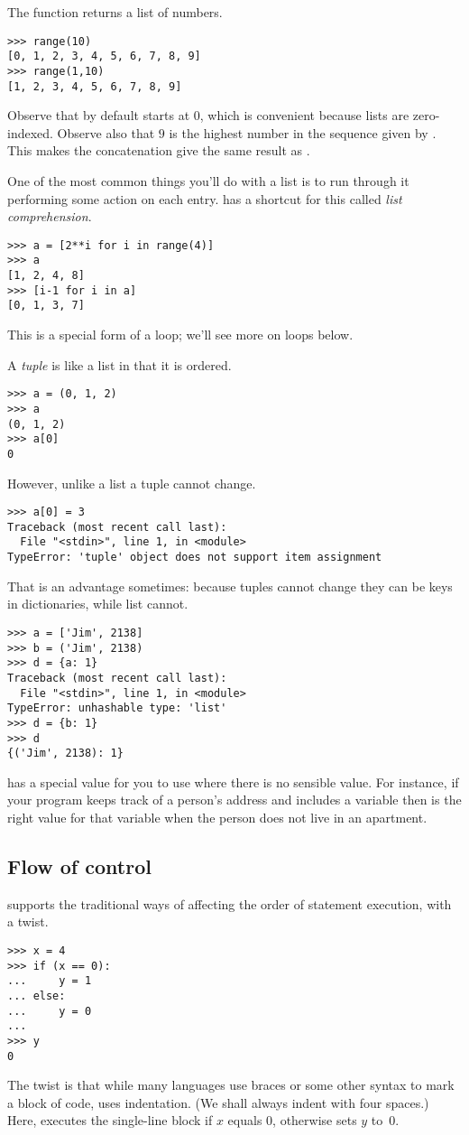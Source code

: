 The function  returns a list of numbers.
\begin{lstlisting}[style=python]
 >>> range(10)
[0, 1, 2, 3, 4, 5, 6, 7, 8, 9]
>>> range(1,10)
[1, 2, 3, 4, 5, 6, 7, 8, 9] 
\end{lstlisting}
Observe that by default  starts at $0$, which
is convenient because lists are zero-indexed.
Observe also that $9$ is the highest number in the sequence 
given by .
This makes the concatenation  give 
the same result as .

One of the most common things you'll do with a list is to run through
it performing some action on each entry.
\python{} has a shortcut for this called \textit{list comprehension}.
\begin{lstlisting}
>>> a = [2**i for i in range(4)]
>>> a
[1, 2, 4, 8]
>>> [i-1 for i in a]
[0, 1, 3, 7]
\end{lstlisting}
This is a special form of a loop; we'll see more on loops below.

A \textit{tuple} is like a list in that it is ordered.
\begin{lstlisting}[style=python]
>>> a = (0, 1, 2)
>>> a
(0, 1, 2)
>>> a[0]
0
\end{lstlisting}
However, unlike a list a tuple cannot change.
\begin{lstlisting}[style=python]
>>> a[0] = 3
Traceback (most recent call last):
  File "<stdin>", line 1, in <module>
TypeError: 'tuple' object does not support item assignment
\end{lstlisting}
That is an advantage sometimes:
because tuples cannot change they can be keys in dictionaries, while
list cannot.
\begin{lstlisting}[style=python]
>>> a = ['Jim', 2138]
>>> b = ('Jim', 2138)
>>> d = {a: 1}
Traceback (most recent call last):
  File "<stdin>", line 1, in <module>
TypeError: unhashable type: 'list'
>>> d = {b: 1}
>>> d
{('Jim', 2138): 1}
\end{lstlisting}

\python{} has a special value  for you to use
where there is no sensible value.
For instance, if your program keeps track of a person's address and
includes a variable  then  is
the right value for that variable when the person does not live in an
apartment.



\subsection{Flow of control}
\python{} supports the traditional ways of affecting the order of 
statement execution, with a twist.
\begin{lstlisting}[style=python]
>>> x = 4
>>> if (x == 0):
...     y = 1
... else:
...     y = 0
... 
>>> y
0
\end{lstlisting}
The twist is that while many languages use braces or some other syntax to
mark a block of code, \python{} uses indentation.
(We shall always indent with four spaces.)
Here, \python{} executes the single-line block  if $x$
equals $0$, otherwise \python{} sets $y$ to~$0$. 

